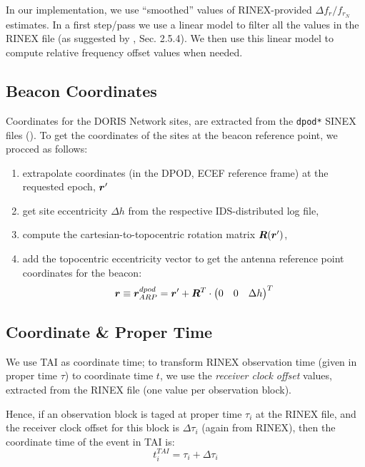In our implementation, we use ``smoothed'' values of RINEX-provided 
$\Delta f_r / f_{r_N}$ estimates. In a first step/pass we use a linear model 
to filter all the values in the RINEX file (as suggested by \cite{lemoine-2016}, 
Sec. 2.5.4). We then use this linear model to compute relative frequency offset 
values when needed. 

\subsection{Beacon Coordinates}
\label{ssec:beacon_coordinates}
Coordinates for the DORIS Network sites, are extracted from the \texttt{dpod*} 
SINEX files (\cite{Moreaux2020}). To get the coordinates of the sites at the 
beacon reference point, we procced as follows:
\begin{enumerate}
  \item extrapolate coordinates (in the DPOD, ECEF reference frame) at the 
    requested epoch, $\bm{r}\sp{\prime}$
  \item get site eccentricity $\Delta h$ from the respective IDS-distributed 
    log file,
  \item compute the cartesian-to-topocentric rotation matrix $\bm{R}(\bm{r}\sp{\prime})$,
  \item add the topocentric eccentricity vector to get the antenna reference
    point coordinates for the beacon:
    \begin{equation}
      \bm{r} \equiv \bm{r}^{dpod}_{ARP} = 
        \bm{r}\sp{\prime} + \bm{R}^T \cdot 
          \begin{pmatrix} 0 & 0 & \Delta h \end{pmatrix}^T
      \label{eq:rg-to-rarp}
    \end{equation}
\end{enumerate}

\subsection{Coordinate \& Proper Time}
\label{ssec:coordinate-proper-time}
We use TAI as coordinate time; to transform RINEX observation time (given in 
proper time $\tau$) to coordinate time $t$, we use the \emph{receiver clock 
offset} values, extracted from the RINEX file (one value per observation block).

Hence, if an observation block is taged at proper time $\tau _i$ at the RINEX 
file, and the receiver clock offset for this block is $\Delta \tau _i$ (again from 
RINEX), then the coordinate time of the event in TAI is:
\begin{equation}
  t^{TAI}_i = \tau _i + \Delta \tau _i
\end{equation}

